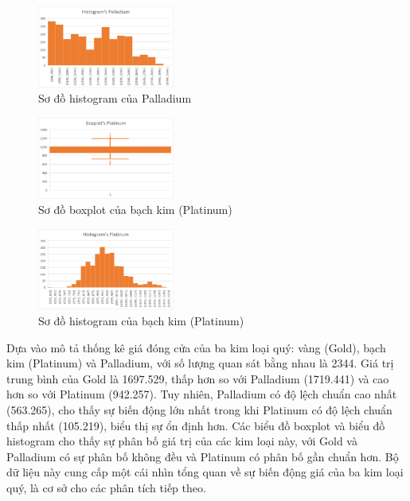 \begin{figure}[H]
\centerline{\includegraphics[width=0.4\textwidth]{img/Picture6.png}}
\caption{Sơ đồ histogram của Palladium}
\label{fig}
\end{figure}

\begin{figure}[H]
\centerline{\includegraphics[width=0.4\textwidth]{img/Picture4.png}}
\caption{Sơ đồ boxplot của bạch kim (Platinum)}
\label{fig}
\end{figure}

\begin{figure}[H]
\centerline{\includegraphics[width=0.4\textwidth]{img/Picture7.png}}
\caption{Sơ đồ histogram của bạch kim (Platinum)}
\label{fit}
\end{figure}

Dựa vào mô tả thống kê giá đóng cửa của ba kim loại quý: vàng (Gold), bạch kim (Platinum) và Palladium, với số lượng quan sát bằng nhau là 2344. Giá trị trung bình của Gold là 1697.529, thấp hơn so với Palladium (1719.441) và cao hơn so với Platinum (942.257). Tuy nhiên, Palladium có độ lệch chuẩn cao nhất (563.265), cho thấy sự biến động lớn nhất trong khi Platinum có độ lệch chuẩn thấp nhất (105.219), biểu thị sự ổn định hơn. Các biểu đồ boxplot và biểu đồ histogram cho thấy sự phân bố giá trị của các kim loại này, với Gold và Palladium có sự phân bố không đều và Platinum có phân bố gần chuẩn hơn. Bộ dữ liệu này cung cấp một cái nhìn tổng quan về sự biến động giá của ba kim loại quý, là cơ sở cho các phân tích tiếp theo.
